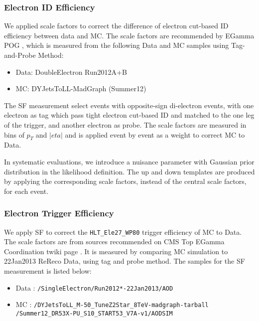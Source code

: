 \subsubsection{Electron ID Efficiency}
We applied scale factors to correct the difference of electron cut-based ID efficiency between data and MC. The scale factors are recommended by EGamma POG\cite{Electron-ID-efficiency wiki}\cite{Electron-ID-efficiency AN} , which is measured from the following Data and MC samples using Tag-and-Probe Method:
\begin{itemize}
\item Data: DoubleElectron Run2012A+B
\item MC: DYJetsToLL-MadGraph (Summer12)
\end{itemize}
The SF measurement select events with opposite-sign di-electron events, with one electron as tag which pass tight electron cut-based ID and matched to the one leg of the trigger, and another electron as probe. The scale factors are measured in bins of $p_T$ and $|eta|$ and is applied event by event as a weight to correct MC to Data.

In systematic evaluations, we introduce a nuisance parameter with Gaussian prior distribution in the likelihood definition. The up and down templates are produced by applying the corresponding scale factors, instead of the central scale factors, for each event. 

\subsubsection{Electron Trigger Efficiency}
We apply SF to correct the \texttt{HLT\_Ele27\_WP80} trigger efficiency of MC to Data. The scale factors are from sources recommended on CMS Top EGamma Coordination twiki page \cite{Top-Egamma-wiki}. It is measured by comparing MC simulation to 22Jan2013 ReReco Data, using tag and probe method\cite{Electron-Trigger-Efficiency wiki}\cite{Electron-Trigger-Efficiency AN}. The samples for the SF measurement is listed below:
\begin{itemize}
\item Data : \texttt{/SingleElectron/Run2012*-22Jan2013/AOD}
\item MC : \texttt{/DYJetsToLL\_M-50\_TuneZ2Star\_8TeV-madgraph-tarball \\
           /Summer12\_DR53X-PU\_S10\_START53\_V7A-v1/AODSIM}
\end{itemize}

